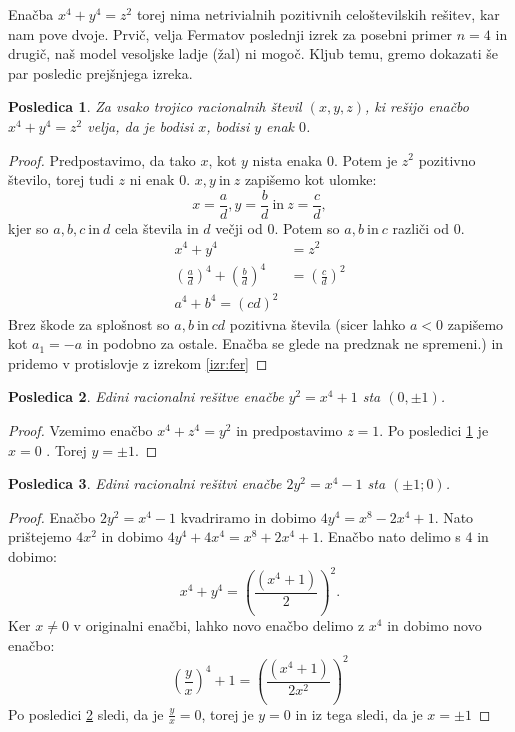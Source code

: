 \documentclass[a4paper, 10pt]{article}
\newtheorem{posl}{Posledica}[izr]
\begin{document}
Enačba $x^4 + y^4 = z^2$ torej nima netrivialnih pozitivnih celoštevilskih rešitev, kar nam pove dvoje. Prvič, velja Fermatov poslednji izrek za posebni primer $n = 4$ in drugič, naš model vesoljske ladje (žal) ni mogoč. Kljub temu, gremo dokazati še par posledic prejšnjega izreka.

\begin{posl}
\label{pos:ena}
Za vsako trojico racionalnih števil $(x, y, z)$, ki rešijo enačbo $x^4 + y^4 = z^2$ velja, da je bodisi $x$, bodisi $y$ enak $0$.
\end{posl}

\begin{proof}
Predpostavimo, da tako $x$, kot $y$ nista enaka $0$. Potem je $z^2$ pozitivno število, torej tudi $z$ ni enak $0$. $x, y~\text{in}~z$ zapišemo kot ulomke:
\[
x = \frac{a}{d}, y = \frac{b}{d}~\text{in}~z=\frac{c}{d},
\]
kjer so $a, b, c~\text{in}~d$ cela števila in $d$ večji od $0$. Potem so $a, b~\text{in}~c$ različi od $0$.
\begin{align*}
x^4 + y^4 &= z^2 \\
(\frac{a}{d})^4 + (\frac{b}{d})^4 &= (\frac{c}{d})^2 \\
a^4 + b^4 = (cd)^2
\end{align*}
Brez škode za splošnost so $a, b~\text{in}~cd$ pozitivna števila (sicer lahko $a<0$ zapišemo kot $a_1 = -a$ in podobno za ostale. Enačba se glede na predznak ne spremeni.) in pridemo v protislovje z izrekom \ref{izr:fer}
\end{proof}

\begin{posl}
\label{pos:dva}
Edini racionalni rešitve enačbe $y^2 = x^4 + 1$ sta $(0, \pm1)$.
\end{posl}

\begin{proof}
Vzemimo enačbo $x^4 + z^4 = y^2$ in predpostavimo $z = 1$. Po posledici \ref{pos:ena} je $x = 0$ . Torej $y = \pm 1$.
\end{proof}

\begin{posl}
\label{pos:tri}
Edini racionalni rešitvi enačbe $2y^2 = x^4 - 1$ sta $(\pm1; 0)$.
\end{posl}

\begin{proof}
Enačbo $2y^2 = x^4 - 1$ kvadriramo in dobimo $4y^4 = x^8 - 2x^4 + 1$. Nato prištejemo $4x^2$ in dobimo $4y^4 + 4x^4 = x^8 +2x^4 + 1$. Enačbo nato delimo s $4$ in dobimo:
\[
x^4 + y^4 = (\frac{(x^4 + 1)}{2})^2.
\]
Ker $x\neq 0$ v originalni enačbi, lahko novo enačbo delimo z $x^4$ in dobimo novo enačbo:
\[
(\frac{y}{x})^4 + 1 = (\frac{(x^4 + 1)}{2x^2})^2
\]
Po posledici \ref{pos:dva} sledi, da je $\frac{y}{x} = 0$, torej je $y = 0$ in iz tega sledi, da je $x = \pm 1$
\end{proof}
\end{document}
